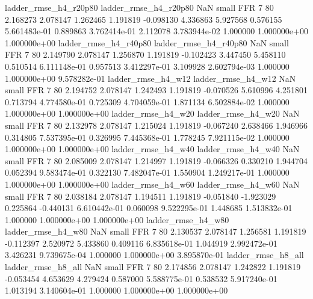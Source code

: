    ladder_rmse_h4_r20p80    ladder_rmse_h4_r20p80                   NaN      small      FFR                 7 80 2.168273       2.078147 1.262465       1.191819   -0.098130      4.336863      5.927568     0.576155   5.661483e-01  0.889863 3.762414e-01     2.112078   3.783944e-02            1.000000    1.000000e+00        1.000000e+00
   ladder_rmse_h4_r40p80    ladder_rmse_h4_r40p80                   NaN      small      FFR                 7 80 2.149790       2.078147 1.256870       1.191819   -0.102423      3.447450      5.458110     0.510514   6.111148e-01  0.957513 3.412297e-01     3.109928   2.602794e-03            1.000000    1.000000e+00        9.578282e-01
      ladder_rmse_h4_w12       ladder_rmse_h4_w12                   NaN      small      FFR                 7 80 2.194752       2.078147 1.242493       1.191819   -0.070526      5.610996      4.251801     0.713794   4.774580e-01  0.725309 4.704059e-01     1.871134   6.502884e-02            1.000000    1.000000e+00        1.000000e+00
      ladder_rmse_h4_w20       ladder_rmse_h4_w20                   NaN      small      FFR                 7 80 2.132978       2.078147 1.215024       1.191819   -0.067240      2.638466      1.946966     0.314805   7.537395e-01  0.326995 7.445368e-01     1.778245   7.921115e-02            1.000000    1.000000e+00        1.000000e+00
      ladder_rmse_h4_w40       ladder_rmse_h4_w40                   NaN      small      FFR                 7 80 2.085009       2.078147 1.214997       1.191819   -0.066326      0.330210      1.944704     0.052394   9.583474e-01  0.322130 7.482047e-01     1.550904   1.249217e-01            1.000000    1.000000e+00        1.000000e+00
      ladder_rmse_h4_w60       ladder_rmse_h4_w60                   NaN      small      FFR                 7 80 2.038184       2.078147 1.194511       1.191819   -0.051840     -1.923029      0.225864    -0.440131   6.610442e-01  0.060098 9.522295e-01     1.448685   1.513832e-01            1.000000    1.000000e+00        1.000000e+00
      ladder_rmse_h4_w80       ladder_rmse_h4_w80                   NaN      small      FFR                 7 80 2.130537       2.078147 1.256581       1.191819   -0.112397      2.520972      5.433860     0.409116   6.835618e-01  1.044919 2.992472e-01     3.426231   9.739675e-04            1.000000    1.000000e+00        3.895870e-01
      ladder_rmse_h8_all       ladder_rmse_h8_all                   NaN      small      FFR                 7 80 2.174856       2.078147 1.242822       1.191819   -0.053454      4.653629      4.279424     0.587000   5.588775e-01  0.538532 5.917240e-01     1.013194   3.140604e-01            1.000000    1.000000e+00        1.000000e+00
